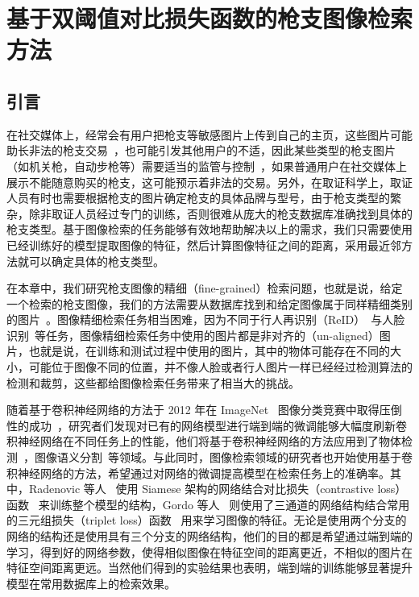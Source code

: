 
\chapter{基于双阈值对比损失函数的枪支图像检索方法}\label{chapter:double_margin}

\section{引言}
在社交媒体上，经常会有用户把枪支等敏感图片上传到自己的主页，这些图片可能助长非法的枪支交易~\cite{Drange2016,MELE2016FacebookBG}，也可能引发其他用户的不适，因此某些类型的枪支图片（如机关枪，自动步枪等）需要适当的监管与控制~\cite{Hsu2018Bumble}，如果普通用户在社交媒体上展示不能随意购买的枪支，这可能预示着非法的交易。另外，在取证科学上，取证人员有时也需要根据枪支的图片确定枪支的具体品牌与型号，由于枪支类型的繁杂，除非取证人员经过专门的训练，否则很难从庞大的枪支数据库准确找到具体的枪支类型。基于图像检索的任务能够有效地帮助解决以上的需求，我们只需要使用已经训练好的模型提取图像的特征，然后计算图像特征之间的距离，采用最近邻方法就可以确定具体的枪支类型。

在本章中，我们研究枪支图像的精细（fine-grained）检索问题，也就是说，给定一个检索的枪支图像，我们的方法需要从数据库找到和给定图像属于同样精细类别的图片~\cite{Song2016DeepML,Wang2017DeepML}。图像精细检索任务相当困难，因为不同于行人再识别（ReID）~\cite{Zhao2013UnsupervisedSL,Li2014DeepReIDDF}与人脸识别~\cite{Wen2016ADF,Taigman2014DeepFaceCT}等任务，图像精细检索任务中使用的图片都是非对齐的（un-aligned）图片，也就是说，在训练和测试过程中使用的图片，其中的物体可能存在不同的大小，可能位于图像不同的位置，并不像人脸或者行人图片一样已经经过检测算法的检测和裁剪，这些都给图像检索任务带来了相当大的挑战。

随着基于卷积神经网络的方法于 2012 年在 ImageNet~\cite{Russakovsky2015ImageNetLS} 图像分类竞赛中取得压倒性的成功~\cite{Krizhevsky2012ImageNetCW}，研究者们发现对已有的网络模型进行端到端的微调能够大幅度刷新卷积神经网络在不同任务上的性能，他们将基于卷积神经网络的方法应用到了物体检测~\cite{Liu2016SSDSS,Redmon2016YouOL,Lin2017FocalLF,Ren2017FasterRT}，图像语义分割~\cite{Shelhamer2017FullyCN,Chen2018DeepLabSI,Noh2015LearningDN}等领域。与此同时，图像检索领域的研究者也开始使用基于卷积神经网络的方法，希望通过对网络的微调提高模型在检索任务上的准确率。其中，Radenovic 等人~\cite{Radenovic2016CNNIR} 使用 Siamese 架构的网络结合对比损失（contrastive loss）函数~\cite{Chopra2005LearningAS,Hadsell2006DimensionalityRB,Han2015MatchNetUF} 来训练整个模型的结构，Gordo 等人~\cite{Gordo2016DeepIR} 则使用了三通道的网络结构结合常用的三元组损失（triplet loss）函数~\cite{Schroff2015FaceNetAU,Wang2014LearningFI,G2016LearningLI,Weinberger2006DistanceML} 用来学习图像的特征。无论是使用两个分支的网络的结构还是使用具有三个分支的网络结构，他们的目的都是希望通过端到端的学习，得到好的网络参数，使得相似图像在特征空间的距离更近，不相似的图片在特征空间距离更远。当然他们得到的实验结果也表明，端到端的训练能够显著提升模型在常用数据库上的检索效果。

